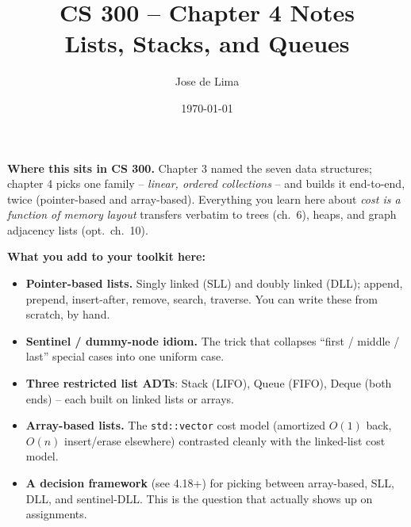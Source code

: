 \documentclass[11pt]{article}
\title{CS 300 -- Chapter 4 Notes\\\large Lists, Stacks, and Queues}
\author{Jose de Lima}
\date{\today}
\begin{document}
\maketitle

\begin{ideabox}
\textbf{Where this sits in CS 300.} Chapter 3 named the seven data
structures; chapter 4 picks one family -- \emph{linear, ordered
collections} -- and builds it end-to-end, twice (pointer-based and
array-based). Everything you learn here about \emph{cost is a function
of memory layout} transfers verbatim to trees (ch.~6), heaps, and graph
adjacency lists (opt.\ ch.~10).

\textbf{What you add to your toolkit here:}
\begin{itemize}
    \item \textbf{Pointer-based lists.} Singly linked (SLL) and doubly
          linked (DLL); append, prepend, insert-after, remove, search,
          traverse. You can write these from scratch, by hand.
    \item \textbf{Sentinel / dummy-node idiom.} The trick that collapses
          ``first / middle / last'' special cases into one uniform case.
    \item \textbf{Three restricted list ADTs}: Stack (LIFO), Queue
          (FIFO), Deque (both ends) -- each built on linked lists or
          arrays.
    \item \textbf{Array-based lists.} The \texttt{std::vector} cost
          model (amortized $O(1)$ back, $O(n)$ insert/erase elsewhere)
          contrasted cleanly with the linked-list cost model.
    \item \textbf{A decision framework} (see 4.18+) for picking between
          array-based, SLL, DLL, and sentinel-DLL. This is the question
          that actually shows up on assignments.
\end{itemize}


\end{ideabox}
\end{document}
